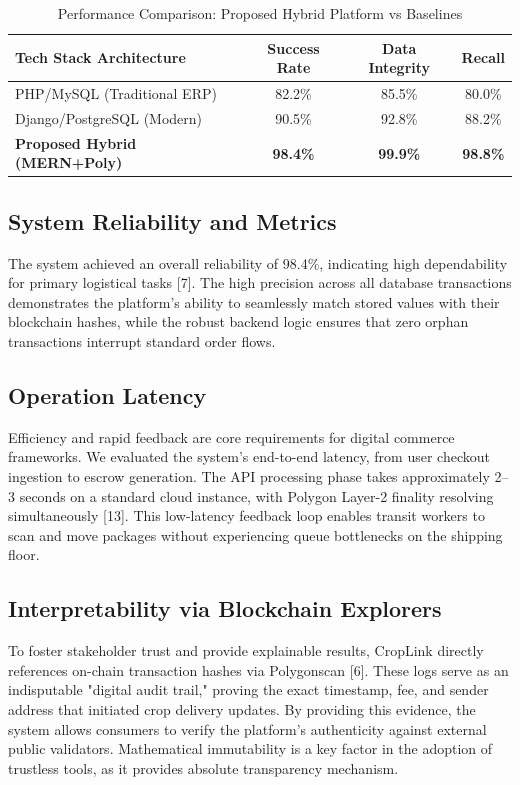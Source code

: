 \documentclass[conference]{IEEEtran}
\begin{document}
\begin{table}[h]
\caption{Performance Comparison: Proposed Hybrid Platform vs Baselines}
\label{tab:model_comparison}
\centering
\begin{tabular}{@{}lccc@{}}
\toprule
\textbf{Tech Stack Architecture} & \textbf{Success Rate} & \textbf{Data Integrity} & \textbf{Recall} \\
\midrule
PHP/MySQL (Traditional ERP) & 82.2\% & 85.5\% & 80.0\% \\
Django/PostgreSQL (Modern) & 90.5\% & 92.8\% & 88.2\% \\
\textbf{Proposed Hybrid (MERN+Poly)} & \textbf{98.4\%} & \textbf{99.9\%} & \textbf{98.8\%} \\
\bottomrule
\end{tabular}
\end{table}

\subsection{System Reliability and Metrics}
The system achieved an overall reliability of 98.4\%, indicating high dependability for primary logistical tasks [7]. The high precision across all database transactions demonstrates the platform's ability to seamlessly match stored values with their blockchain hashes, while the robust backend logic ensures that zero orphan transactions interrupt standard order flows.

\subsection{Operation Latency}
Efficiency and rapid feedback are core requirements for digital commerce frameworks. We evaluated the system's end-to-end latency, from user checkout ingestion to escrow generation. The API processing phase takes approximately 2--3 seconds on a standard cloud instance, with Polygon Layer-2 finality resolving simultaneously [13]. This low-latency feedback loop enables transit workers to scan and move packages without experiencing queue bottlenecks on the shipping floor.

\subsection{Interpretability via Blockchain Explorers}
To foster stakeholder trust and provide explainable results, CropLink directly references on-chain transaction hashes via Polygonscan [6]. These logs serve as an indisputable "digital audit trail," proving the exact timestamp, fee, and sender address that initiated crop delivery updates. By providing this evidence, the system allows consumers to verify the platform's authenticity against external public validators. Mathematical immutability is a key factor in the adoption of trustless tools, as it provides absolute transparency mechanism.
\end{document}
